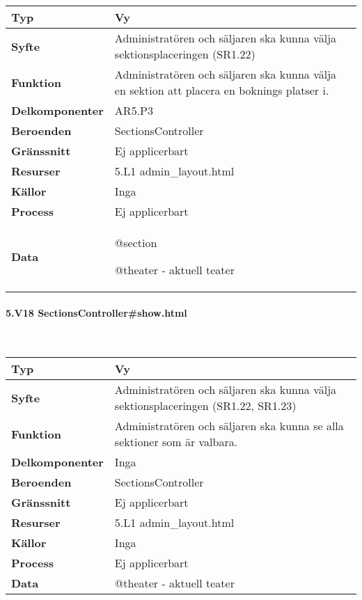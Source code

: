 \documentclass[a4paper, twoside, 11pt, titlepage]{article}
\begin{document}
			\begin {table} [ht] \begin{tabular} {  p{3.5cm} p{11.6cm} }
				\hline
				{\sffamily\textbf{Typ}} & {Vy} \\
				\hline
				{\sffamily\textbf{Syfte}} & {Administratören och säljaren ska kunna välja sektionsplaceringen (SR1.22)} \\
				\hline
				{\sffamily\textbf{Funktion}} & {Administratören och säljaren ska kunna välja en sektion att placera en boknings platser i.} \\
				\hline
				{\sffamily\textbf{Delkomponenter}} & {AR5.P3} \\
				\hline
				{\sffamily\textbf{Beroenden}} & {SectionsController} \\
				\hline
				{\sffamily\textbf{Gränssnitt}} & {Ej applicerbart} \\
				\hline
				{\sffamily\textbf{Resurser}} & {5.L1 admin\_layout.html} \\
				\hline
				{\sffamily\textbf{Källor}} & {Inga} \\
				\hline
				{\sffamily\textbf{Process}} & {Ej applicerbart} \\
				\hline
				{\sffamily\textbf{Data}} & {@section

@theater - aktuell teater} \\
				\hline
			\end{tabular} \end{table} \FloatBarrier


			\clearpage %
			\paragraph{5.V18 SectionsController\#show.html}\

			\begin {table} [ht] \begin{tabular} {  p{3.5cm} p{11.6cm} }
				\hline
				{\sffamily\textbf{Typ}} & {Vy} \\
				\hline
				{\sffamily\textbf{Syfte}} & {Administratören och säljaren ska kunna välja sektionsplaceringen (SR1.22, SR1.23)} \\
				\hline
				{\sffamily\textbf{Funktion}} & {Administratören och säljaren ska kunna se alla sektioner som är valbara.} \\
				\hline
				{\sffamily\textbf{Delkomponenter}} & {Inga} \\
				\hline
				{\sffamily\textbf{Beroenden}} & {SectionsController} \\
				\hline
				{\sffamily\textbf{Gränssnitt}} & {Ej applicerbart} \\
				\hline
				{\sffamily\textbf{Resurser}} & {5.L1 admin\_layout.html} \\
				\hline
				{\sffamily\textbf{Källor}} & {Inga} \\
				\hline
				{\sffamily\textbf{Process}} & {Ej applicerbart} \\
				\hline
				{\sffamily\textbf{Data}} & {@theater - aktuell teater} \\
				\hline
			\end{tabular} \end{table} \FloatBarrier
\end{document}
